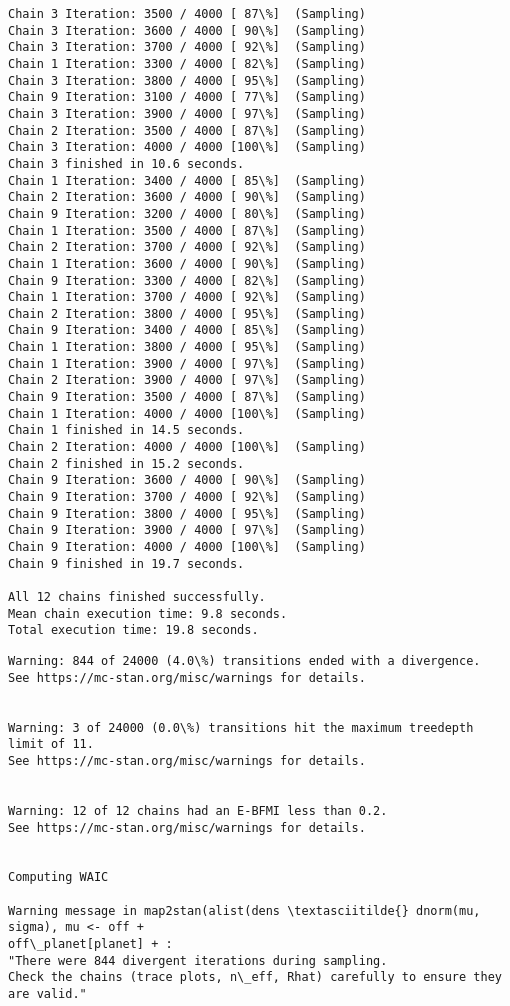 \documentclass[11pt]{article}
\begin{document}
\begin{Verbatim}[commandchars=\\\{\}]
Chain 3 Iteration: 3500 / 4000 [ 87\%]  (Sampling)
Chain 3 Iteration: 3600 / 4000 [ 90\%]  (Sampling)
Chain 3 Iteration: 3700 / 4000 [ 92\%]  (Sampling)
Chain 1 Iteration: 3300 / 4000 [ 82\%]  (Sampling)
Chain 3 Iteration: 3800 / 4000 [ 95\%]  (Sampling)
Chain 9 Iteration: 3100 / 4000 [ 77\%]  (Sampling)
Chain 3 Iteration: 3900 / 4000 [ 97\%]  (Sampling)
Chain 2 Iteration: 3500 / 4000 [ 87\%]  (Sampling)
Chain 3 Iteration: 4000 / 4000 [100\%]  (Sampling)
Chain 3 finished in 10.6 seconds.
Chain 1 Iteration: 3400 / 4000 [ 85\%]  (Sampling)
Chain 2 Iteration: 3600 / 4000 [ 90\%]  (Sampling)
Chain 9 Iteration: 3200 / 4000 [ 80\%]  (Sampling)
Chain 1 Iteration: 3500 / 4000 [ 87\%]  (Sampling)
Chain 2 Iteration: 3700 / 4000 [ 92\%]  (Sampling)
Chain 1 Iteration: 3600 / 4000 [ 90\%]  (Sampling)
Chain 9 Iteration: 3300 / 4000 [ 82\%]  (Sampling)
Chain 1 Iteration: 3700 / 4000 [ 92\%]  (Sampling)
Chain 2 Iteration: 3800 / 4000 [ 95\%]  (Sampling)
Chain 9 Iteration: 3400 / 4000 [ 85\%]  (Sampling)
Chain 1 Iteration: 3800 / 4000 [ 95\%]  (Sampling)
Chain 1 Iteration: 3900 / 4000 [ 97\%]  (Sampling)
Chain 2 Iteration: 3900 / 4000 [ 97\%]  (Sampling)
Chain 9 Iteration: 3500 / 4000 [ 87\%]  (Sampling)
Chain 1 Iteration: 4000 / 4000 [100\%]  (Sampling)
Chain 1 finished in 14.5 seconds.
Chain 2 Iteration: 4000 / 4000 [100\%]  (Sampling)
Chain 2 finished in 15.2 seconds.
Chain 9 Iteration: 3600 / 4000 [ 90\%]  (Sampling)
Chain 9 Iteration: 3700 / 4000 [ 92\%]  (Sampling)
Chain 9 Iteration: 3800 / 4000 [ 95\%]  (Sampling)
Chain 9 Iteration: 3900 / 4000 [ 97\%]  (Sampling)
Chain 9 Iteration: 4000 / 4000 [100\%]  (Sampling)
Chain 9 finished in 19.7 seconds.

All 12 chains finished successfully.
Mean chain execution time: 9.8 seconds.
Total execution time: 19.8 seconds.

    \end{Verbatim}

    \begin{Verbatim}[commandchars=\\\{\}]
Warning: 844 of 24000 (4.0\%) transitions ended with a divergence.
See https://mc-stan.org/misc/warnings for details.


Warning: 3 of 24000 (0.0\%) transitions hit the maximum treedepth limit of 11.
See https://mc-stan.org/misc/warnings for details.


Warning: 12 of 12 chains had an E-BFMI less than 0.2.
See https://mc-stan.org/misc/warnings for details.


Computing WAIC

Warning message in map2stan(alist(dens \textasciitilde{} dnorm(mu, sigma), mu <- off +
off\_planet[planet] + :
"There were 844 divergent iterations during sampling.
Check the chains (trace plots, n\_eff, Rhat) carefully to ensure they are valid."
    \end{Verbatim}
\end{document}
